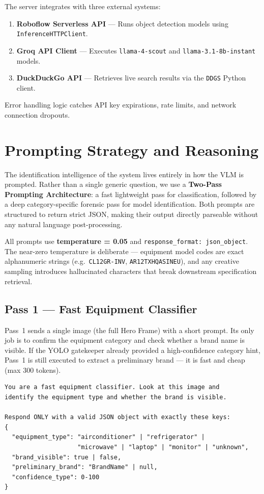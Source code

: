 The server integrates with three external systems:
\begin{enumerate}
  \item \textbf{Roboflow Serverless API} — Runs object detection models using \texttt{InferenceHTTPClient}.
  \item \textbf{Groq API Client} — Executes \texttt{llama-4-scout} and \texttt{llama-3.1-8b-instant} models.
  \item \textbf{DuckDuckGo API} — Retrieves live search results via the \texttt{DDGS} Python client.
\end{enumerate}
Error handling logic catches API key expirations, rate limits, and network connection dropouts.

\section{Prompting Strategy and Reasoning}
\label{sec:ch4-prompting}

The identification intelligence of the system lives entirely in how the VLM is prompted. Rather than a single generic question, we use a \textbf{Two-Pass Prompting Architecture}: a fast lightweight pass for classification, followed by a deep category-specific forensic pass for model identification. Both prompts are structured to return strict JSON, making their output directly parseable without any natural language post-processing.

All prompts use \textbf{temperature = 0.05} and \texttt{response\_format: json\_object}. The near-zero temperature is deliberate — equipment model codes are exact alphanumeric strings (e.g.\ \texttt{CL12GR-INV}, \texttt{AR12TXHQASINEU}), and any creative sampling introduces hallucinated characters that break downstream specification retrieval.

\subsection{Pass 1 — Fast Equipment Classifier}

Pass~1 sends a single image (the full Hero Frame) with a short prompt. Its only job is to confirm the equipment category and check whether a brand name is visible. If the YOLO gatekeeper already provided a high-confidence category hint, Pass~1 is still executed to extract a preliminary brand — it is fast and cheap (max 300 tokens).

\begin{lstlisting}[language={}, caption={Pass 1 prompt sent to Groq Llama-4-Scout (frame\_detector.py)}, label={lst:pass1}]
You are a fast equipment classifier. Look at this image and
identify the equipment type and whether the brand is visible.

Respond ONLY with a valid JSON object with exactly these keys:
{
  "equipment_type": "airconditioner" | "refrigerator" |
                    "microwave" | "laptop" | "monitor" | "unknown",
  "brand_visible": true | false,
  "preliminary_brand": "BrandName" | null,
  "confidence_type": 0-100
}
\end{lstlisting}

